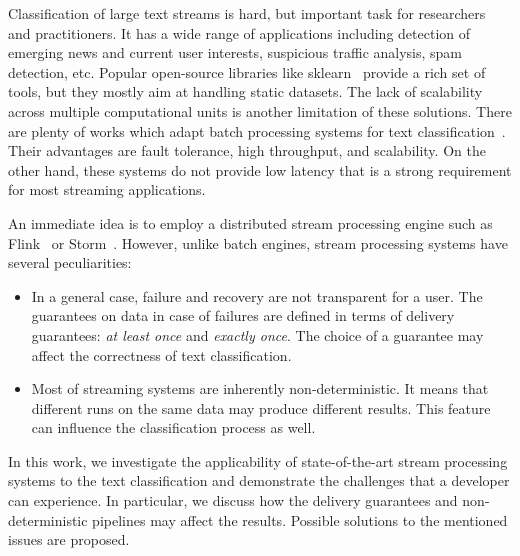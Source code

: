 \label {fs-short-intro}

Classification of large text streams is hard, but important task for researchers and practitioners. It has a wide range of applications including detection of emerging news and current user interests, suspicious traffic analysis, spam detection, etc. Popular open-source libraries like sklearn~\cite{sklearn_api} provide a rich set of tools, but they mostly aim at handling static datasets. The lack of scalability across multiple computational units is another limitation of these solutions. There are plenty of works which adapt batch processing systems for text classification~\cite{semberecki2016distributed, svyatkovskiy2016large, baltas2016apache}. Their advantages are fault tolerance, high throughput, and scalability. On the other hand, these systems do not provide low latency that is a strong requirement for most streaming applications.

An immediate idea is to employ a distributed stream processing engine such as Flink~\cite{Carbone:2017:SMA:3137765.3137777} or Storm~\cite{apache:storm}. However, unlike batch engines, stream processing systems have several peculiarities: 

\begin{itemize}
    \item In a general case, failure and recovery are not transparent for a user. The guarantees on data in case of failures are defined in terms of delivery guarantees: {\em at least once} and {\em exactly once}. The choice of a guarantee may affect the correctness of text classification.
    \item Most of streaming systems are inherently non-deterministic. It means that different runs on the same data may produce different results. This feature can influence the classification process as well.
\end{itemize}

In this work, we investigate the applicability of state-of-the-art stream processing systems to the text classification and demonstrate the challenges that a developer can experience. In particular, we discuss how the delivery guarantees and non-deterministic pipelines may affect the results. Possible solutions to the mentioned issues are proposed. 